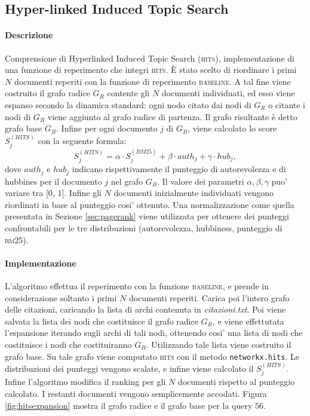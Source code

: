 \subsection{Hyper-linked Induced Topic Search}
\label{sec:hits}

\paragraph{\textbf{Descrizione}}
Comprensione di Hyperlinked Induced Topic Search (\textsc{hits}), implementazione di una funzione di reperimento che integri \textsc{hits}. \`E stato scelto di riordinare i primi $N$ documenti reperiti con la funzione di reperimento \textsc{baseline}. A tal fine viene costruito il grafo radice $G_R$ contente gli $N$ documenti individuati, ed esso viene espanso secondo la dinamica standard: ogni nodo citato dai nodi di $G_R$ o citante i nodi di $G_R$ viene aggiunto al grafo radice di partenza. Il grafo risultante \`e detto grafo base $G_B$. Infine per ogni documento $j$ di $G_B$, viene calcolato lo score $S^{(HITS)}_{j}$ con la seguente formula:
\[ S^{(HITS)}_j =  \alpha \cdot S^{(BM25)}_j + \beta \cdot auth_j + \gamma \cdot hub_j,\]
dove $auth_j$ e $hub_j$ indicano rispettivamente il punteggio di autorevolezza e di hubbines per il documento $j$ nel grafo $G_B$. Il valore dei parametri $\alpha, \beta, \gamma$ puo' variare tra [0, 1]. Infine gli $N$ documenti inizialmente individuati vengono riordinati in base al punteggio cosi' ottenuto. Una normalizzazione come quella presentata in Sezione \ref{sec:pagerank} viene utilizzata per ottenere dei punteggi confrontabili per le tre distribuzioni (autorevolezza, hubbiness, punteggio di \textsc{bm25}).
\paragraph{\textbf{Implementazione}}
L'algoritmo effettua il reperimento con la funzione \textsc{baseline}, e prende in considerazione soltanto i primi $N$ documenti reperiti. Carica poi l'intero grafo delle citazioni, caricando la lista di archi contenuta in \textit{citazioni.txt}. Poi viene salvata la lista dei nodi che costituisce il grafo radice $G_R$, e viene effettutata l'espansione iterando sugli archi di tali nodi, ottenendo cosi' una lista di nodi che costituisce i nodi che costituiranno $G_B$. Utilizzando tale lista viene costruito il grafo base. Su tale grafo viene computato \textsc{hits} con il metodo \texttt{networkx.hits}. Le distribuzioni dei punteggi vengono scalate, e infine viene calcolato il $S^{(HITS)}_j$. Infine l'algoritmo modifica il ranking per gli $N$ documenti rispetto al punteggio calcolato. I restanti documenti vengono semplicemente accodati. Figura \ref{fig:hitsexpansion} mostra il grafo radice e il grafo base per la query $56$.

